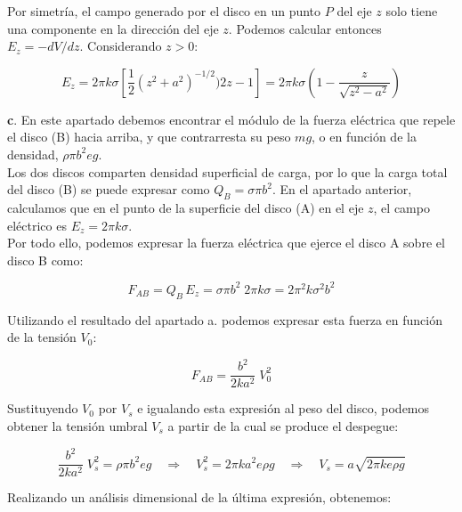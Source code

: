 Por simetría, el campo generado por el disco en un punto $P$ del eje $z$ solo tiene una componente en la dirección del eje $z$. Podemos calcular entonces
$E_z = - dV / dz$. Considerando $z > 0$:

\begin{equation*}
    E_z = 2\pi k \sigma \left[ \frac{1}{2}(z^2 + a^2)^{-1/2})2z -1 \right] = 2\pi k \sigma \left( 1 - \frac{z}{\sqrt{z^2 - a^2}} \right)
\end{equation*}


\vspace{20px}

\textbf{c}. En este apartado debemos encontrar el módulo de la fuerza eléctrica que repele el disco (B) hacia arriba, y que contrarresta su peso
$mg$, o en función de la densidad, $\rho \pi b^2 e g$.\\

Los dos discos comparten densidad superficial de carga, por lo que la carga total del disco (B) se puede expresar como $Q_B = \sigma \pi b^2$.
En el apartado anterior, calculamos que en el punto de la superficie del disco (A) en el eje $z$, el campo eléctrico es $E_z = 2 \pi k \sigma$.\\

Por todo ello, podemos expresar la fuerza eléctrica que ejerce el disco A sobre el disco B como:

\begin{equation*}
    F_{AB} = Q_B\,E_z = \sigma \pi b^2 \;2 \pi k \sigma = 2 \pi^2 k \sigma^2 b^2
\end{equation*}

Utilizando el resultado del apartado a. podemos expresar esta fuerza en función de la tensión $V_0$:

\begin{equation*}
    F_{AB} = \frac{b^2}{2ka^2}\;V_{0}^2
\end{equation*}

Sustituyendo $V_0$ por $V_s$ e igualando esta expresión al peso del disco, podemos obtener
la tensión umbral $V_{s}$ a partir de la cual se produce el despegue:


\begin{equation*}
    \frac{b^2}{2ka^2}\;V_{s}^2 = \rho \pi b^2 e g \quad \Rightarrow \quad
    V_{s}^2 = 2 \pi k a^2 e \rho g  \quad \Rightarrow \quad
    V_s = a \sqrt{2 \pi k e \rho g}
\end{equation*}

Realizando un análisis dimensional de la última expresión, obtenemos:

